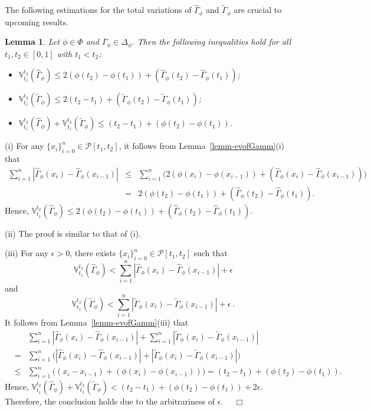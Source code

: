 \documentclass[12pt]{article}
\renewenvironment{proof}{\noindent{\bf Proof.}}{~~$\Box$}
\theoremstyle{plain}
\newtheorem{lemm}[thrm]{Lemma}%
\theoremstyle{definition}
\begin{document}
The following estimations for the total variations of $\hat{\Gamma}_\phi$ and $\tilde{\Gamma}_\phi$ are crucial to upcoming results.
\begin{lemm}\label{lemm-evofTV}
Let $\phi\in\Phi$ and $\Gamma_\phi\in\Delta_\phi$. Then the following inequalities hold for all $t_1, t_2\in[0, 1]$ with $t_1<t_2$:
\begin{itemize}\setlength{\itemindent}{10pt}
\item[{\rm (i)}] $\mathbb{V}_{t_1}^{t_2}(\hat{\Gamma}_\phi)\leq 2(\phi(t_2)-\phi(t_1))+ (\hat{\Gamma}_\phi(t_2)-\hat{\Gamma}_\phi(t_1))$;
\item[{\rm (ii)}] $\mathbb{V}_{t_1}^{t_2}(\tilde{\Gamma}_\phi)\leq 2(t_2-t_1)+(\tilde{\Gamma}_\phi(t_2)-\tilde{\Gamma}_\phi(t_1))$;
\item[{\rm (iii)}] $\mathbb{V}_{t_1}^{t_2}(\hat{\Gamma}_\phi)+ \mathbb{V}_{t_1}^{t_2}(\tilde{\Gamma}_\phi)\leq (t_2-t_1)+ (\phi(t_2)-\phi(t_1))$.
\end{itemize}
\end{lemm}
\begin{proof}
(i) For any $\{x_i\}_{i=0}^n\in\mathcal P[t_1, t_2]$, it follows from Lemma~\ref{lemm-evofGamm}(i) that
\begin{eqnarray*}
\sum_{i=1}^n|\hat{\Gamma}_\phi(x_i)-\hat{\Gamma}_\phi(x_{i-1})|
&\leq& \sum_{i=1}^n\bigg(2(\phi(x_{i})-\phi(x_{i-1}))+(\hat{\Gamma}_\phi(x_i)-\hat{\Gamma}_\phi(x_{i-1}))\bigg)\\
&=& 2(\phi(t_2)-\phi(t_1))+(\hat{\Gamma}_\phi(t_2)-\hat{\Gamma}_\phi(t_1)).
\end{eqnarray*}
Hence, $\mathbb{V}_{t_1}^{t_2}(\hat{\Gamma}_\phi)\leq 2(\phi(t_2)-\phi(t_1))+ (\hat{\Gamma}_\phi(t_2)-\hat{\Gamma}_\phi(t_1))$.

(ii) The proof is similar to that of (i).

(iii) For any $\epsilon>0$, there exists $\{x_i\}_{i=0}^n\in\mathcal P[t_1, t_2]$ such that
\[
\mathbb{V}_{t_1}^{t_2}(\hat{\Gamma}_\phi)<\sum_{i=1}^n|\hat{\Gamma}_\phi(x_i)-\hat{\Gamma}_\phi(x_{i-1})|+\epsilon
\]
and
\[
\mathbb{V}_{t_1}^{t_2}(\tilde{\Gamma}_\phi)<\sum_{i=1}^n|\tilde{\Gamma}_\phi(x_i)-\tilde{\Gamma}_\phi(x_{i-1})|+\epsilon~.
\]
It follows from Lemma~\ref{lemm-evofGamm}(iii) that
\begin{eqnarray*}
&&\sum_{i=1}^n|\hat{\Gamma}_\phi(x_i)-\hat{\Gamma}_\phi(x_{i-1})|+ \sum_{i=1}^n|\tilde{\Gamma}_\phi(x_i)-\tilde{\Gamma}_\phi(x_{i-1})|\\
&=&\sum_{i=1}^n\Big(|\hat{\Gamma}_\phi(x_i)-\hat{\Gamma}_\phi(x_{i-1})|+|\tilde{\Gamma}_\phi(x_i)-\tilde{\Gamma}_\phi(x_{i-1})|\Big)\\
&\leq& \sum_{i=1}^n\Big((x_i-x_{i-1})+(\phi(x_{i})-\phi(x_{i-1}))\Big)
= (t_2-t_1)+(\phi(t_2)-\phi(t_1)).
\end{eqnarray*}
Hence, $\mathbb{V}_{t_1}^{t_2}(\hat{\Gamma}_\phi)+\mathbb{V}_{t_1}^{t_2}(\tilde{\Gamma}_\phi)<(t_2-t_1)+(\phi(t_2)-\phi(t_1))+2\epsilon$.
Therefore, the conclusion holds due to the arbitrariness of $\epsilon$.
\end{proof}
\end{document}
